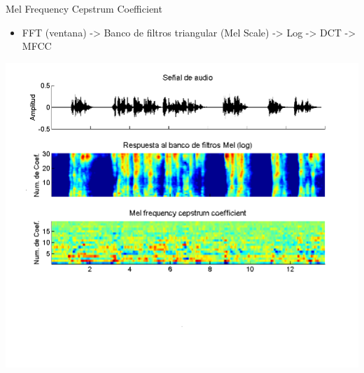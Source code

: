 \begin{frame}{Mel Frequency Cepstrum Coefficient}
  \begin{itemize}
    \item \small{FFT (ventana) -> Banco de filtros triangular (Mel Scale) -> Log -> DCT -> MFCC}
  \end{itemize} 
  \begin{center}
    \includegraphics[width=1\textwidth]{gfx/f-mfcc}
  \end{center}
\end{frame}